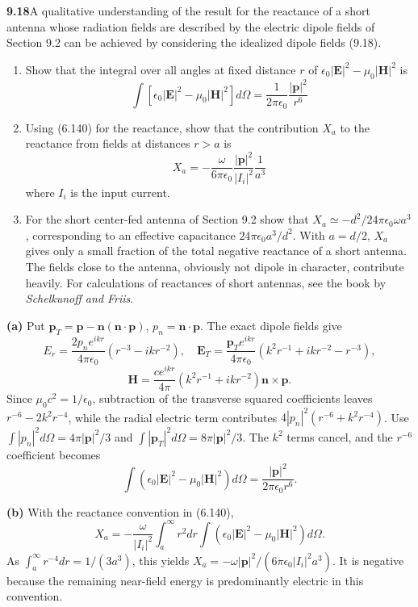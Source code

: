 \par\bigskip
\noindent\textbf{9.18}\quad A qualitative understanding of the result for the reactance of a short antenna whose radiation fields are described by the electric dipole fields of Section 9.2 can be achieved by considering the idealized dipole fields (9.18).
\begin{enumerate}
\item[(a)] Show that the integral over all angles at fixed distance $r$ of $\epsilon_{0}|\mathbf{E}|^{2}-\mu_{0}|\mathbf{H}|^{2}$ is
\[
\int\left[\epsilon_{0}|\mathbf{E}|^{2}-\mu_{0}|\mathbf{H}|^{2}\right]d\Omega=\frac{1}{2\pi\epsilon_{0}}\frac{|\mathbf{p}|^{2}}{r^{6}}
\]
\item[(b)] Using (6.140) for the reactance, show that the contribution $X_{a}$ to the reactance from fields at distances $r>a$ is
\[
X_{a}=-\frac{\omega}{6\pi\epsilon_{0}}\frac{|\mathbf{p}|^{2}}{|I_{i}|^{2}}\frac{1}{a^{3}}
\]
where $I_{i}$ is the input current.
\item[(c)] For the short center-fed antenna of Section 9.2 show that $X_{a}\simeq-d^{2}/24\pi\epsilon_{0}\omega a^{3}$, corresponding to an effective capacitance $24\pi\epsilon_{0}a^{3}/d^{2}$. With $a=d/2$, $X_{a}$ gives only a small fraction of the total negative reactance of a short antenna. The fields close to the antenna, obviously not dipole in character, contribute heavily. For calculations of reactances of short antennas, see the book by \emph{Schelkunoff and Friis}.
\end{enumerate}
\solution

\textbf{(a)} Put $\mathbf p_T=\mathbf p-\mathbf n(\mathbf n\cdot\mathbf p)$,
$p_n=\mathbf n\cdot\mathbf p$. The exact dipole fields give
\[
E_r=\frac{2p_ne^{ikr}}{4\pi\epsilon_0}
(r^{-3}-ikr^{-2}),\quad
\mathbf E_T=\frac{\mathbf p_Te^{ikr}}{4\pi\epsilon_0}
(k^2r^{-1}+ikr^{-2}-r^{-3}),
\]
\[
\mathbf H=\frac{ce^{ikr}}{4\pi}
(k^2r^{-1}+ikr^{-2})\mathbf n\times\mathbf p.
\]
Since $\mu_0c^2=1/\epsilon_0$, subtraction of the transverse squared
coefficients leaves $r^{-6}-2k^2r^{-4}$, while the radial electric
term contributes $4|p_n|^2(r^{-6}+k^2r^{-4})$.
Use
$\int|p_n|^2d\Omega=4\pi|\mathbf p|^2/3$ and
$\int|\mathbf p_T|^2d\Omega=8\pi|\mathbf p|^2/3$.
The $k^2$ terms cancel, and the $r^{-6}$ coefficient becomes
\[
\boxed{\int(\epsilon_0|\mathbf E|^2-\mu_0|\mathbf H|^2)d\Omega
=\frac{|\mathbf p|^2}{2\pi\epsilon_0r^6}.}
\]

\textbf{(b)} With the reactance convention in (6.140),
\[
X_a=-\frac\omega{|I_i|^2}
\int_a^\infty r^2dr\int(\epsilon_0|\mathbf E|^2-\mu_0|\mathbf H|^2)d\Omega.
\]
As $\int_a^\infty r^{-4}dr=1/(3a^3)$, this yields
$X_a=-\omega|\mathbf p|^2/(6\pi\epsilon_0|I_i|^2a^3)$.
It is negative because the remaining near-field energy is predominantly
electric in this convention.

